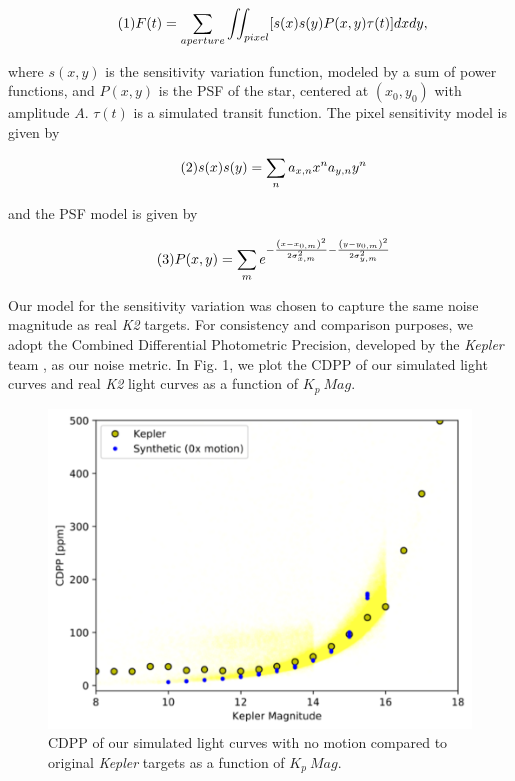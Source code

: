 \documentclass[12pt,preprint]{emulateapj}
\begin{document}
\[
\tag{1}
F(t)=\sum_{aperture} \iint_{pixel} [s(x)s(y)P(x,y)\tau (t)]dxdy,\\
\]

where $s(x,y)$ is the sensitivity variation function, modeled by a sum of power functions, and $P(x,y)$ is the PSF of the star, centered at $(x_0,y_0)$ with amplitude $A$. $\tau (t)$ is a simulated transit function. The pixel sensitivity model is given by

\[
\tag{2}
s(x)s(y) = \sum_n a_{x,n}x^na_{y,n}y^n \\
\]

and the PSF model is given by

\[
\tag{3}
P(x,y) = \sum_m e^{-\frac{\left(x-x_{0,m} \right)^2}{2\sigma_{x,m}^2}-\frac{\left(y-y_{0,m} \right)^2}{2\sigma_{y,m}^2}} \\
\]

Our model for the sensitivity variation was chosen to capture the same noise magnitude as real \textit{K2} targets. For consistency and comparison purposes, we adopt the Combined Differential Photometric Precision, developed by the \textit{Kepler} team \citep{2012PASP..124.1279C}, as our noise metric. In Fig. 1, we plot the CDPP of our simulated light curves and real \textit{K2} light curves as a function of $K_p\ Mag$.

\begin{figure}[h]
	\centering
	\includegraphics[width=1.0\linewidth]{nomotion.png}
	\caption{CDPP of our simulated light curves with no motion compared to original \textit{Kepler} targets as a function of $K_p\ Mag$.}
	\label{fig:nomotion}
\end{figure}
\end{document}
